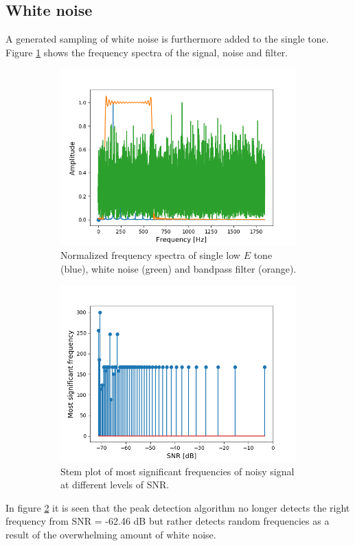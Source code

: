 \subsection{White noise}
A generated sampling of white noise is furthermore added to the single tone. Figure \ref{fig:white_spectrum} shows the frequency spectra of the signal, noise and filter.
\begin{figure}[H]
\begin{subfigure}{0.49\textwidth}
\centering
\includegraphics[width=\textwidth]{figures/SNR/white_spectrum.png}
\caption{Normalized frequency spectra of single low $E$ tone (blue), white noise (green) and bandpass filter (orange).}
\label{fig:white_spectrum}
\end{subfigure}
\begin{subfigure}{0.49\textwidth}
\centering
\includegraphics[width=\textwidth]{figures/SNR/white_stem.png}
\caption{Stem plot of most significant frequencies of noisy signal at different levels of SNR.}
\label{fig:white_stem}
\end{subfigure}
\caption{}
\label{fig:white_noise}
\end{figure}
In figure \ref{fig:white_stem} it is seen that the peak detection algorithm no longer detects the right frequency from SNR = -62.46 dB but rather detects random frequencies as a result of the overwhelming amount of white noise.


